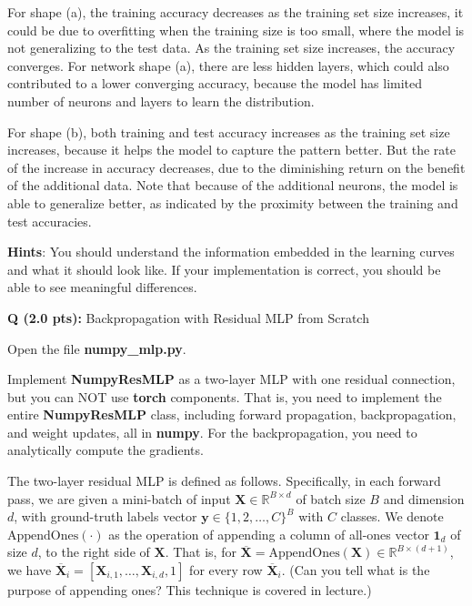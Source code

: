 \documentclass{article}
\newcounter{questionno}
\newcounter{partno}
\newcommand{\question}[1]{
\noindent
\newline
\stepcounter{questionno}
\setcounter{partno}{0}
{\bf Q\arabic{questionno} (#1 pts): }
}
\begin{document}
\begin{enumerate}
          For shape (a), the training accuracy decreases as the training set
          size increases, it could be due to overfitting when the training size
          is too small, where the model is not generalizing to the test data. As
          the training set size increases, the accuracy converges. For network
          shape (a), there are less hidden layers, which could also contributed
          to a lower converging accuracy, because the model has limited number
          of neurons and layers to learn the distribution.

          For shape (b), both training and test accuracy increases as the
          training set size increases, because it helps the model to capture the
          pattern better. But the rate of the increase in accuracy decreases,
          due to the diminishing return on the benefit of the additional data.
          Note that because of the additional neurons, the model is able to
          generalize better, as indicated by the proximity between the training
          and test accuracies.

    \end{enumerate}


\noindent \textbf{Hints}: You should understand the information embedded in
    the learning curves and what it should look like. If your implementation
    is correct, you should be able to see meaningful differences.


\newpage
\question{2.0}{Backpropagation with Residual MLP from Scratch}

\noindent Open the file \textbf{numpy\_mlp.py}. 

Implement \textbf{NumpyResMLP} as a two-layer MLP with one residual connection, but you can NOT use \textbf{torch} components. That is, you need to implement the entire \textbf{NumpyResMLP} class, including forward propagation, backpropagation, and weight updates, all in \textbf{numpy}. For the backpropagation, you need to analytically compute the gradients.

The two-layer residual MLP is defined as follows. Specifically, in each forward pass, we are given a mini-batch of input $\mathbf{X} \in \mathbb{R}^{B \times d}$ of batch size $B$ and dimension $d$, with ground-truth labels vector $\mathbf{y} \in \{1, 2, \dots, C\}^B$ with $C$ classes. We denote $\text{AppendOnes}(\cdot)$ as the operation of appending a column of all-ones vector $\mathbf{1}_d$ of size $d$, to the right side of $\mathbf{X}$. That is, for $\overline{\mathbf{X}} = \text{AppendOnes}(\mathbf{X}) \in \mathbb{R}^{B \times (d + 1)}$, we have $\overline{\mathbf{X}}_i = [\mathbf{X}_{i, 1}, \dots, \mathbf{X}_{i, d}, 1]$ for every row $\overline{\mathbf{X}}_i$. (Can you tell what is the purpose of appending ones? This technique is covered in lecture.)
\end{document}
